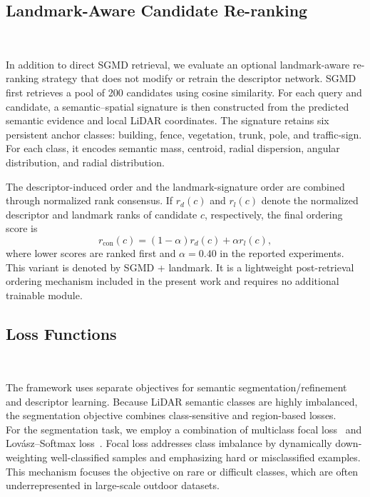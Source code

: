 \subsection{Landmark-Aware Candidate Re-ranking}~\label{subsec:landmark-reranking}

In addition to direct SGMD retrieval, we evaluate an optional landmark-aware re-ranking strategy that does not modify or retrain the descriptor network. SGMD first retrieves a pool of 200 candidates using cosine similarity. For each query and candidate, a semantic--spatial signature is then constructed from the predicted semantic evidence and local LiDAR coordinates. The signature retains six persistent anchor classes: building, fence, vegetation, trunk, pole, and traffic-sign. For each class, it encodes semantic mass, centroid, radial dispersion, angular distribution, and radial distribution.

The descriptor-induced order and the landmark-signature order are combined through normalized rank consensus. If $r_d(c)$ and $r_l(c)$ denote the normalized descriptor and landmark ranks of candidate $c$, respectively, the final ordering score is
\begin{equation}
	r_{\mathrm{con}}(c)
	=
	(1-\alpha)r_d(c)+\alpha r_l(c),
\end{equation}
where lower scores are ranked first and $\alpha=0.40$ in the reported experiments. This variant is denoted by SGMD + landmark. It is a lightweight post-retrieval ordering mechanism included in the present work and requires no additional trainable module.

\subsection{Loss Functions}~\label{subsec:loss-function}

The framework uses separate objectives for semantic segmentation/refinement and descriptor learning. Because LiDAR semantic classes are highly imbalanced, the segmentation objective combines class-sensitive and region-based losses. \\

For the segmentation task, we employ a combination of multiclass focal loss~\cite{LinTsung2020} and Lovász--Softmax loss~\cite{BermanMaxim2018}. Focal loss addresses class imbalance by dynamically down-weighting well-classified samples and emphasizing hard or misclassified examples. This mechanism focuses the objective on rare or difficult classes, which are often underrepresented in large-scale outdoor datasets.

